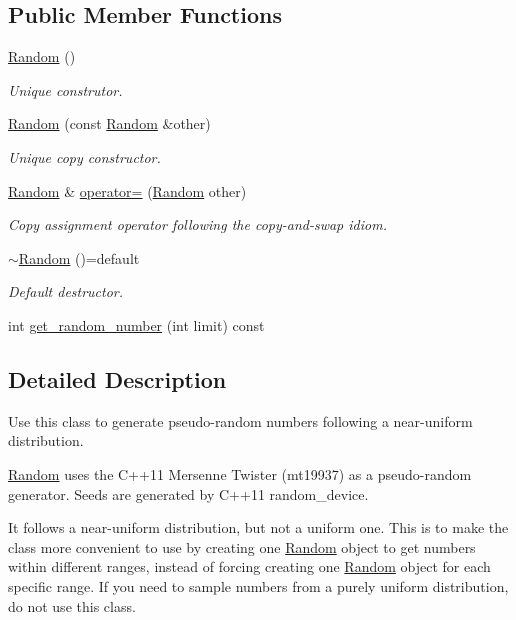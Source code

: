 \subsection*{Public Member Functions}
\begin{DoxyCompactItemize}
\item 
\hyperlink{classghost_1_1Random_a7c45efd1f7c522a68760104ba6084d89}{Random} ()
\begin{DoxyCompactList}\small\item\em Unique construtor. \end{DoxyCompactList}\item 
\hyperlink{classghost_1_1Random_aa57a39ee45a9ba30d7f7ea2c4c17b539}{Random} (const \hyperlink{classghost_1_1Random}{Random} \&other)
\begin{DoxyCompactList}\small\item\em Unique copy constructor. \end{DoxyCompactList}\item 
\hyperlink{classghost_1_1Random}{Random} \& \hyperlink{classghost_1_1Random_ab9257479f8e393fc8d205f6a05357ee6}{operator=} (\hyperlink{classghost_1_1Random}{Random} other)
\begin{DoxyCompactList}\small\item\em Copy assignment operator following the copy-\/and-\/swap idiom. \end{DoxyCompactList}\item 
\hyperlink{classghost_1_1Random_a5b2a324a97684d12174a6f97bdb43aaa}{$\sim$\+Random} ()=default
\begin{DoxyCompactList}\small\item\em Default destructor. \end{DoxyCompactList}\item 
int \hyperlink{classghost_1_1Random_acc4f1a79621ed8d77c303cecda571034}{get\+\_\+random\+\_\+number} (int limit) const 
\end{DoxyCompactItemize}


\subsection{Detailed Description}
Use this class to generate pseudo-\/random numbers following a near-\/uniform distribution. 

\hyperlink{classghost_1_1Random}{Random} uses the C++11 Mersenne Twister (mt19937) as a pseudo-\/random generator. Seeds are generated by C++11 random\+\_\+device.

It follows a near-\/uniform distribution, but not a uniform one. This is to make the class more convenient to use by creating one \hyperlink{classghost_1_1Random}{Random} object to get numbers within different ranges, instead of forcing creating one \hyperlink{classghost_1_1Random}{Random} object for each specific range. If you need to sample numbers from a purely uniform distribution, do not use this class. 

